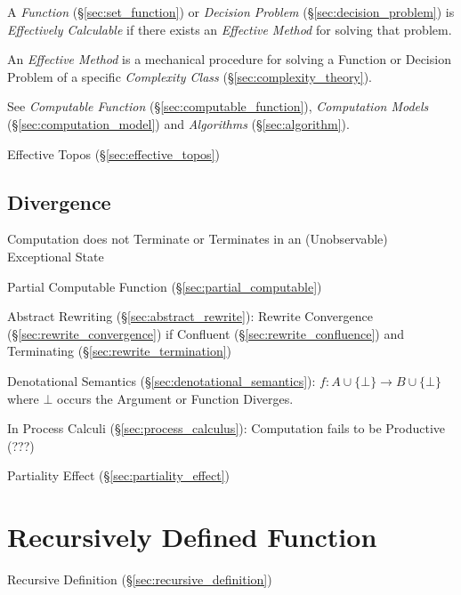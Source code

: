 A \emph{Function} (\S\ref{sec:set_function}) or \emph{Decision
  Problem} (\S\ref{sec:decision_problem}) is \emph{Effectively
  Calculable} if there exists an \emph{Effective Method} for solving
that problem.

An \emph{Effective Method} is a mechanical procedure for solving a
Function or Decision Problem of a specific \emph{Complexity Class}
(\S\ref{sec:complexity_theory}).

See \emph{Computable Function} (\S\ref{sec:computable_function}),
\emph{Computation Models} (\S\ref{sec:computation_model}) and
\emph{Algorithms} (\S\ref{sec:algorithm}).

Effective Topos (\S\ref{sec:effective_topos})



\subsection{Divergence}\label{sec:divergence}

Computation does not Terminate or Terminates in an (Unobservable)
Exceptional State

Partial Computable Function (\S\ref{sec:partial_computable})

Abstract Rewriting (\S\ref{sec:abstract_rewrite}): Rewrite Convergence
(\S\ref{sec:rewrite_convergence}) if Confluent
(\S\ref{sec:rewrite_confluence}) and Terminating
(\S\ref{sec:rewrite_termination})

Denotational Semantics (\S\ref{sec:denotational_semantics}): $f : A
\cup \{\bot\} \rightarrow B \cup \{\bot\}$ where $\bot$ occurs the
Argument or Function Diverges.

In Process Calculi (\S\ref{sec:process_calculus}): Computation fails
to be Productive (???) %

Partiality Effect (\S\ref{sec:partiality_effect})



\section{Recursively Defined Function}\label{sec:recursive_function}

Recursive Definition (\S\ref{sec:recursive_definition})

